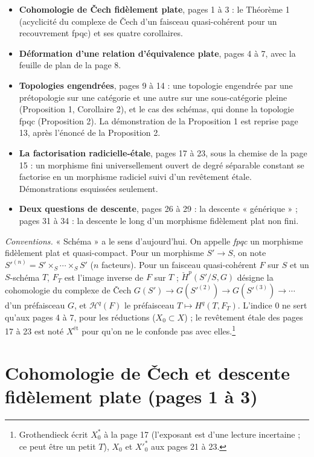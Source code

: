 \documentclass[11pt,a4paper]{article}
\begin{document}
\begin{itemize}
\item \textbf{Cohomologie de Čech fidèlement plate}, pages 1 à 3 : le
Théorème 1 (acyclicité du complexe de Čech d'un faisceau quasi-cohérent pour
un recouvrement fpqc) et ses quatre corollaires.
\item \textbf{Déformation d'une relation d'équivalence plate}, pages 4 à 7,
avec la feuille de plan de la page 8.
\item \textbf{Topologies engendrées}, pages 9 à 14 : une topologie engendrée
par une prétopologie sur une catégorie et une autre sur une sous-catégorie
pleine (Proposition 1, Corollaire 2), et le cas des schémas, qui donne la
topologie fpqc (Proposition 2). La démonstration de la Proposition 1 est
reprise page 13, après l'énoncé de la Proposition 2.
\item \textbf{La factorisation radicielle-étale}, pages 17 à 23, sous la
chemise de la page 15 : un morphisme fini universellement ouvert de degré
séparable constant se factorise en un morphisme radiciel suivi d'un revêtement
étale. Démonstrations esquissées seulement.
\item \textbf{Deux questions de descente}, pages 26 à 29 : la descente
« générique » ; pages 31 à 34 : la descente le long d'un morphisme
fidèlement plat non fini.
\end{itemize}

\emph{Conventions.} « Schéma » a le sens d'aujourd'hui. On appelle
\emph{fpqc} un morphisme fidèlement plat et quasi-compact. Pour un morphisme
$S' \to S$, on note $S'^{(n)} = S' \times_S \cdots \times_S S'$ ($n$
facteurs). Pour un faisceau quasi-cohérent $F$ sur $S$ et un $S$-schéma $T$,
$F_T$ est l'image inverse de $F$ sur $T$ ; $\check{H}^p(S'/S, G)$ désigne la
cohomologie du complexe de Čech
$G(S') \to G(S'^{(2)}) \to G(S'^{(3)}) \to \cdots$ d'un préfaisceau $G$, et
$\mathcal{H}^q(F)$ le préfaisceau $T \mapsto H^q(T, F_T)$. L'indice $0$ ne sert
qu'aux pages 4 à 7, pour les réductions ($X_0 \subset X$) ; le revêtement
étale des pages 17 à 23 est noté $X^{\text{ét}}$ pour qu'on ne le confonde
pas avec elles.\footnote{Grothendieck écrit $X^{*}_0$ à la page 17 (l'exposant
est d'une lecture incertaine ; ce peut être un petit $T$), $X_0$ et $X'^{*}_0$ aux pages 21 à 23.}

\section*{Cohomologie de Čech et descente fidèlement plate (pages 1 à 3)}
\end{document}
